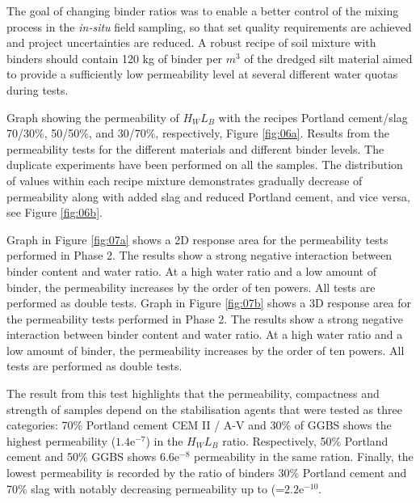 \documentclass{amestyle}
\begin{document}
The goal of changing binder ratios was to enable a better control of the mixing process in the \emph{in-situ} field sampling, so that set quality requirements are achieved and project uncertainties are reduced. A robust recipe of soil mixture with binders should contain 120 kg of binder per $m^3$ of the dredged silt material aimed to provide a sufficiently low permeability level at several different water quotas during tests.   

Graph showing the permeability of $H_WL_B$ with the recipes Portland cement/slag 70/30\%, 50/50\%, and 30/70\%, respectively, Figure \ref{fig:06a}. Results from the permeability tests for the different materials and different binder levels. The duplicate experiments have been performed on all the samples. The distribution of values within each recipe mixture demonstrates gradually decrease of permeability along with added slag and reduced Portland cement, and vice versa, see Figure \ref{fig:06b}. 

Graph in Figure \ref{fig:07a} shows a 2D response area for the permeability tests performed in Phase 2. The results show a strong negative interaction between binder content and water ratio. At a high water ratio and a low amount of binder, the permeability increases by the order of ten powers. All tests are performed as double tests. Graph in Figure \ref{fig:07b} shows a 3D response area for the permeability tests performed in Phase 2. The results show a strong negative interaction between binder content and water ratio. At a high water ratio and a low amount of binder, the permeability increases by the order of ten powers. All tests are performed as double tests.

The result from this test highlights that the permeability, compactness and strength of samples depend on the stabilisation agents that were tested as three categories: 70\% Portland cement CEM II / A-V  and 30\% of GGBS shows the highest permeability ($1.4\mathrm{e}^{-7}$) in the $H_WL_B$ ratio. Respectively, 50\% Portland cement and 50\% GGBS shows $6.6\mathrm{e}^{-8}$ permeability in the same ration. Finally, the lowest permeability is recorded by the ratio of binders 30\% Portland cement and 70\% slag with notably decreasing permeability up to (=$2.2\mathrm{e}^{-10}$. 
\end{document}
